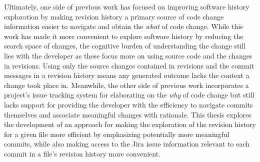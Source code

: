 
Ultimately, one side of previous work has focused on improving software history exploration by making revision history a primary source of code change information easier to navigate and obtain the \emph{what} of code change.
While this work has made it more convenient to explore software history by reducing the search space of changes, the cognitive burden of understanding the change still lies with the developer as these focus more on using source code and the changes in revisions.
Using only the source changes contained in revisions and the commit messages in a revision history means any generated outcome lacks the context a change took place in.
Meanwhile, the other side of previous work incorporates a project's issue tracking system for elaborating on the \emph{why} of code change but still lacks support for providing the developer with the efficiency to navigate commits themselves and associate meaningful changes with rationale.
This thesis explores the development of an approach for making the exploration of the revision history for a given file more efficient by emphasizing potentially more meaningful commits, while also making access to the Jira issue information relevant to each commit in a file's revision history more convenient.

\endinput

Any text after an \endinput is ignored.
You could put scraps here or things in progress.